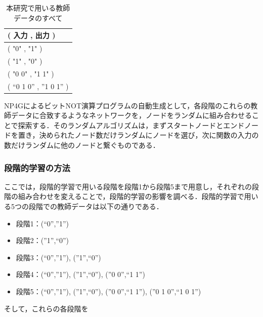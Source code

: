 \documentclass[exploratorypaper]{jsaiart} %
\begin{document}
\begin{table}[htbp]
\centering
\caption{本研究で用いる教師データのすべて}
\label{tbl:TeacherData}
\begin{tabular}{l}
    \hline
     ( 入力 , 出力 ) \\
    \hline \hline
    ( "0" , "1" ) \\
    ( "1" , "0" ) \\
    ( "0 0" , "1 1" ) \\
    ( “0 1 0” , ”1 0 1” ) \\
    \hline
\end{tabular}
\end{table}

NP4GによるビットNOT演算プログラムの自動生成として，各段階のこれらの教師データに合致するようなネットワークを，ノードをランダムに組み合わせることで探索する．そのランダムアルゴリズムは，まずスタートノードとエンドノードを置き，決められたノード数だけランダムにノードを選び，次に関数の入力の数だけランダムに他のノードと繋ぐものである．

\subsubsection{段階的学習の方法}
\label{sec:PLhow}
ここでは，段階的学習で用いる段階を段階1から段階5まで用意し，それぞれの段階の組み合わせを変えることで，段階的学習の影響を調べる．段階的学習で用いる5つの段階での教師データは以下の通りである．


\begin{itemize}
    \item 段階1：(“0”,”1”)
    \item 段階2：(”1”,“0”)
    \item 段階3：(“0”,”1”), (”1”,“0”)
    \item 段階4：(“0”,”1”), (”1”,“0”), (”0 0”,“1 1”)
    \item 段階5：(“0”,”1”), (”1”,“0”), (”0 0”,“1 1”), (”0 1 0”,“1 0 1”)
\end{itemize}

そして，これらの各段階を
\end{document}
